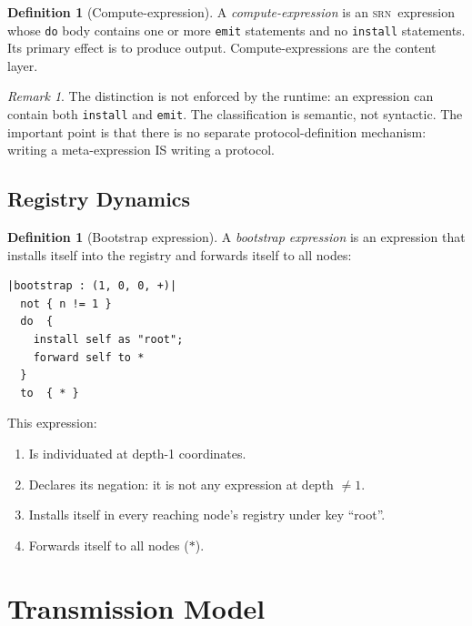 \documentclass[twocolumn,11pt,a4paper]{article}
\theoremstyle{definition}
\newtheorem{definition}[theorem]{Definition}
\theoremstyle{remark}
\newtheorem{remark}[theorem]{Remark}
\newcommand{\srn}{\textsc{srn}}
\begin{document}
\begin{definition}[Compute-expression]
A \emph{compute-expression} is an \srn\ expression whose \texttt{do}
body contains one or more \texttt{emit} statements and no
\texttt{install} statements.  Its primary effect is to produce output.
Compute-expressions are the content layer.
\end{definition}

\begin{remark}
The distinction is not enforced by the runtime: an expression can
contain both \texttt{install} and \texttt{emit}.  The classification
is semantic, not syntactic.  The important point is that there is no
separate protocol-definition mechanism: writing a meta-expression IS
writing a protocol.
\end{remark}

\subsection{Registry Dynamics}

\begin{definition}[Bootstrap expression]
A \emph{bootstrap expression} is an expression that installs itself
into the registry and forwards itself to all nodes:
\end{definition}

\begin{lstlisting}[caption={Bootstrap meta-expression}, label={lst:bootstrap}]
|bootstrap : (1, 0, 0, +)|
  not { n != 1 }
  do  {
    install self as "root";
    forward self to *
  }
  to  { * }
\end{lstlisting}

This expression:
\begin{enumerate}[noitemsep,topsep=2pt]
\item Is individuated at depth-1 coordinates.
\item Declares its negation: it is not any expression at depth $\neq 1$.
\item Installs itself in every reaching node's registry under key ``root''.
\item Forwards itself to all nodes ($*$).
\end{enumerate}

\section{Transmission Model}
\label{sec:transmission}
\end{document}

